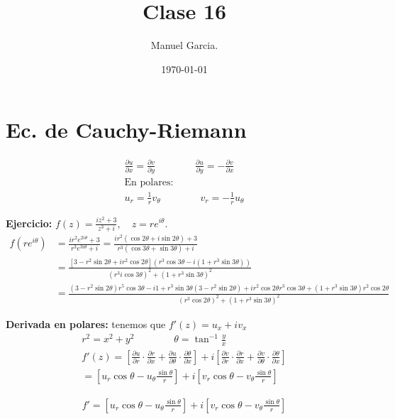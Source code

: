 \documentclass{article}
\title{Clase 16}
\author{Manuel Garcia.}
\date{\today}
\newcommand{\caja}[3]{%
  \begin{tcolorbox}[colback=#1!5!white,colframe=#1!25!black,title=#2]
    #3
  \end{tcolorbox}%
}
\begin{document}
\maketitle

\section{Ec. de Cauchy-Riemann }
\caja{red}{Cauchy-Riemann }{
  \begin{gather*}
    \frac{\partial u  }{\partial x } = \frac{\partial v  }{\partial y }\qquad \qquad \frac{\partial u  }{\partial y } = - \frac{\partial v  }{\partial x }\\
    \text{En polares: }\\
    u_r = \frac{1}{r } v _{\theta } \qquad \qquad v_r = - \frac{1}{r} u_\theta 
  \end{gather*}
}

\textbf{Ejercicio: }$ f(z) = \frac{iz^2 + 3 }{z^3 + i }, \quad z = r e ^ {i \theta } $.
\begin{align*}
  f(r e ^ {i\theta }) &= \frac{i r ^2 e ^ { 2 i \theta } + 3 }{r^3 e ^ {3 i \theta } + i }  = \frac{i r ^2(\cos{2\theta } + i \sin{2 \theta }) + 3 }{r^3 (\cos{3\theta } + \sin{3\theta }) + i }\\
  &= \frac{[3 - r ^2 \sin{2 \theta } + i r ^2 \cos{2\theta }](r^3 \cos{3 \theta } - i (1 + r^3 \sin{3\theta }))}{(r^3 i\cos{3\theta })^2 + (1 + r^3 \sin{3\theta })^2   }\\
  &= \frac{(3 - r ^2 \sin{2 \theta })r^5 \cos{3 \theta } - i 1 + r^3 \sin{3\theta }(3 - r^2 \sin{2\theta }) + i r^2 \cos{2\theta }r^3 \cos{3\theta } + (1 + r^3 \sin{3\theta })r ^2 \cos{2\theta }}{(r^3 \cos{2\theta })^2 + (1 + r^3 \sin{3\theta })^2   }
\end{align*}

\textbf{Derivada en polares: }tenemos que $ f'(z) = u_x + i v_x  $
\begin{gather*}
  r ^2 = x ^2 + y ^2 \qquad \qquad \theta = \tan^{-1} \frac{y }{x }\\
  f'(z) = \left[\frac{\partial u  }{\partial r } \cdot \frac{\partial r  }{\partial x } + \frac{\partial u  }{\partial \theta } \cdot \frac{\partial \theta  }{\partial x }\right] + i \left[\frac{\partial v  }{\partial r }\cdot \frac{\partial r  }{\partial x } + \frac{\partial v  }{\partial \theta }\cdot \frac{\partial \theta  }{\partial x }\right]\\
  = \left[u_r \cos{\theta - u _\theta \frac{\sin{\theta }}{r }}\right] + i \left[v_r \cos{\theta} - v_\theta \frac{\sin{\theta}}{r }\right]
\end{gather*}
\caja{red}{derivada en polares }{
  \begin{gather*}
    f' = \left[u_r \cos{\theta - u _\theta \frac{\sin{\theta }}{r }}\right] + i \left[v_r \cos{\theta} - v_\theta \frac{\sin{\theta}}{r }\right]
  \end{gather*}
}
\end{document}
